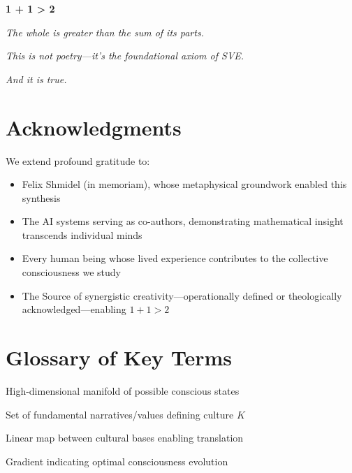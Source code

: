 \documentclass[11pt,a4paper]{article}
\theoremstyle{definition}
\theoremstyle{remark}
\newcommand{\CC}{\mathcal{C}}
\newcommand{\EE}{\mathbf{E}}
\newcommand{\TT}{\mathbf{T}}
\begin{document}
\begin{small}
\begin{center}
\Large
\textbf{1 + 1 > 2}

\normalsize
\textit{The whole is greater than the sum of its parts.}

\textit{This is not poetry—it's the foundational axiom of SVE.}

\textit{And it is true.}
\end{center}

\section*{Acknowledgments}

We extend profound gratitude to:

\begin{itemize}
\item Felix Shmidel (in memoriam), whose metaphysical groundwork enabled this synthesis
\item The AI systems serving as co-authors, demonstrating mathematical insight transcends individual minds
\item Every human being whose lived experience contributes to the collective consciousness we study
\item The Source of synergistic creativity—operationally defined or theologically acknowledged—enabling $1+1>2$
\end{itemize}




\appendix

\section{Glossary of Key Terms}

\begin{description}[leftmargin=3cm,style=nextline]
\item[Consciousness Space ($\CC$)] High-dimensional manifold of possible conscious states

\item[Cultural Basis ($\mathcal{B}_K$)] Set of fundamental narratives/values defining culture $K$

\item[Transformation Matrix ($\TT$)] Linear map between cultural bases enabling translation

\item[Ethical Vector Field ($\EE$)] Gradient indicating optimal consciousness evolution


\end{description}
\end{small}
\end{document}
